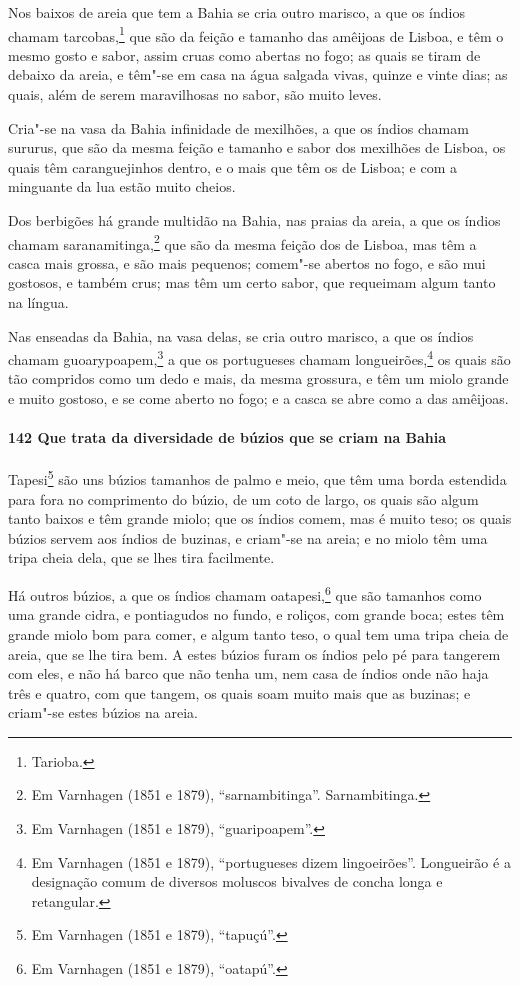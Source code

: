 \begin{linenumbers}
Nos baixos de areia que tem a Bahia se cria outro marisco, a que os índios chamam
tarcobas,\footnote{ Tarioba.} que são da feição e tamanho das amêijoas de Lisboa, e têm o
mesmo gosto e sabor, assim cruas como abertas no fogo; as quais se tiram de debaixo da
areia, e têm"-se em casa na água salgada vivas, quinze e vinte dias; as quais, além de
serem maravilhosas no sabor, são muito leves.

Cria"-se na vasa da Bahia infinidade de mexilhões, a que os índios chamam sururus, que são
da mesma feição e tamanho e sabor dos mexilhões de Lisboa, os quais têm caranguejinhos
dentro, e o mais que têm os de Lisboa; e com a minguante da lua estão muito cheios.

Dos berbigões há grande multidão na Bahia, nas praias da areia, a que os índios chamam
saranamitinga,\footnote{ Em Varnhagen (1851 e 1879), ``sarnambitinga''. Sarnambitinga.}
que são da mesma feição dos de Lisboa, mas têm a casca mais grossa, e são mais pequenos;
comem"-se abertos no fogo, e são mui gostosos, e também crus; mas têm um certo sabor, que
requeimam algum tanto na língua.

Nas enseadas da Bahia, na vasa delas, se cria outro marisco, a que os índios chamam
guoarypoapem,\footnote{ Em Varnhagen (1851 e 1879), ``guaripoapem''.} a que os portugueses
chamam longueirões,\footnote{ Em Varnhagen (1851 e 1879), ``portugueses dizem
lingoeirões''. Longueirão é a designação comum de diversos moluscos bivalves de concha
longa e retangular.} os quais são tão compridos como um dedo e mais, da mesma grossura, e
têm um miolo grande e muito gostoso, e se come aberto no fogo; e a casca se abre como a
das amêijoas.

\paragraph{142 Que trata da diversidade de búzios que se criam na Bahia}\quad
Tapesi\footnote{ Em Varnhagen (1851 e 1879), ``tapuçú''.} são uns búzios tamanhos de palmo
e meio, que têm uma borda estendida para fora no comprimento do búzio, de um coto de
largo, os quais são algum tanto baixos e têm grande miolo; que os índios comem, mas é
muito teso; os quais búzios servem aos índios de buzinas, e criam"-se na areia; e no miolo
têm uma tripa cheia dela, que se lhes tira facilmente.

Há outros búzios, a que os índios chamam oatapesi,\footnote{ Em Varnhagen (1851 e 1879),
``oatapú''.} que são tamanhos como uma grande cidra, e pontiagudos no fundo, e roliços,
com grande boca; estes têm grande miolo bom para comer, e algum tanto teso, o qual tem uma
tripa cheia de areia, que se lhe tira bem. A estes búzios furam os índios pelo pé para
tangerem com eles, e não há barco que não tenha um, nem casa de índios onde não haja três
e quatro, com que tangem, os quais soam muito mais que as buzinas; e criam"-se estes búzios
na areia.


\end{linenumbers}
